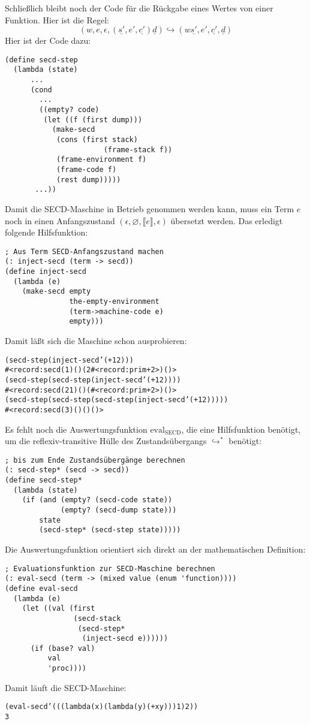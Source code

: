 %
Schließlich bleibt noch der Code für die Rückgabe eines Wertes von
einer Funktion.  Hier ist die Regel:
%
\begin{displaymath}
  (w, e, \epsilon, (\underline{s'}, e', \underline{c'}) \underline{d})
  \hookrightarrow
  (w\underline{s'}, e', \underline{c'}, \underline{d})
\end{displaymath}
%
Hier ist der Code dazu:
%
\begin{verbatim}
(define secd-step
  (lambda (state)
      ...
      (cond
        ...
        ((empty? code)
         (let ((f (first dump)))
           (make-secd
            (cons (first stack)
                       (frame-stack f))
            (frame-environment f)
            (frame-code f)
            (rest dump)))))
       ...))
\end{verbatim}
%
Damit die SECD-Maschine in Betrieb genommen werden kann, muss ein Term
$e$ noch in einen Anfangszustand $(\epsilon, \varnothing, \llbracket
e\rrbracket, \epsilon)$ übersetzt werden.  Das erledigt folgende
Hilfsfunktion:
%
\begin{verbatim}
; Aus Term SECD-Anfangszustand machen
(: inject-secd (term -> secd))
(define inject-secd
  (lambda (e)
    (make-secd empty
               the-empty-environment
               (term->machine-code e)
               empty)))
\end{verbatim}
%
Damit läßt sich die Maschine schon ausprobieren:
%
\begin{alltt}
(secd-step (inject-secd '(+ 1 2)))
\evalsto{}#<record:secd (1) () (2 #<record:prim + 2>) ()>
(secd-step (secd-step (inject-secd '(+ 1 2))))
\evalsto{}#<record:secd (2 1) () (#<record:prim + 2>) ()>
(secd-step (secd-step (secd-step (inject-secd '(+ 1 2)))))
\evalsto{}#<record:secd (3) () () ()>
\end{alltt}
%
Es fehlt noch die Auswertungsfunktion $\mathrm{eval}_\mathrm{SECD}$,
die eine Hilfsfunktion benötigt, um die reflexiv-transitive Hülle des
Zustandsübergangs $\hookrightarrow^*$ benötigt:
%
\begin{verbatim}
; bis zum Ende Zustandsübergänge berechnen
(: secd-step* (secd -> secd))
(define secd-step*
  (lambda (state)
    (if (and (empty? (secd-code state))
             (empty? (secd-dump state)))
        state
        (secd-step* (secd-step state)))))
\end{verbatim}
%
Die Auswertungsfunktion orientiert sich direkt an der mathematischen
Definition:
%
\begin{verbatim}
; Evaluationsfunktion zur SECD-Maschine berechnen
(: eval-secd (term -> (mixed value (enum 'function))))
(define eval-secd
  (lambda (e)
    (let ((val (first
                (secd-stack
                 (secd-step* 
                  (inject-secd e))))))
      (if (base? val)
          val
          'proc))))
\end{verbatim}
%
Damit läuft die SECD-Maschine:
%
\begin{alltt}
(eval-secd '(((lambda (x) (lambda (y) (+ x y))) 1) 2))
\evalsto{}3
\end{alltt}

